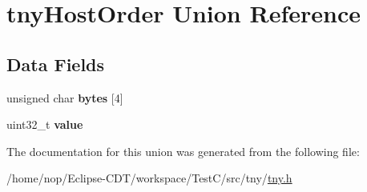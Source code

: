 \hypertarget{uniontnyHostOrder}{\section{tny\-Host\-Order \-Union \-Reference}
\label{uniontnyHostOrder}
}
\subsection*{\-Data \-Fields}
\begin{DoxyCompactItemize}
\item 
\hypertarget{uniontnyHostOrder_acb739679aaa1bd09e24d4beaa7be664d}{unsigned char {\bfseries bytes} \mbox{[}4\mbox{]}}\label{uniontnyHostOrder_acb739679aaa1bd09e24d4beaa7be664d}

\item 
\hypertarget{uniontnyHostOrder_af1709a3a3564c5b566aedc547311bd91}{uint32\-\_\-t {\bfseries value}}\label{uniontnyHostOrder_af1709a3a3564c5b566aedc547311bd91}

\end{DoxyCompactItemize}


\-The documentation for this union was generated from the following file\-:\begin{DoxyCompactItemize}
\item 
/home/nop/\-Eclipse-\/\-C\-D\-T/workspace/\-Test\-C/src/tny/\hyperlink{tny_8h}{tny.\-h}\end{DoxyCompactItemize}
